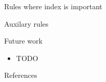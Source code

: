 \documentclass[unicode, aspectratio=169]{beamer}
\begin{document}
    \begin{frame}{Rules where index is important}
            
    \end{frame}

    \begin{frame}{Auxilary rules}
        
    \end{frame}

    \begin{frame}{Future work}
        \begin{itemize}
            \item{TODO}
        \end{itemize}
    \end{frame}

    \begin{frame}{References}
        \printbibliography
    \end{frame}
\end{document}

